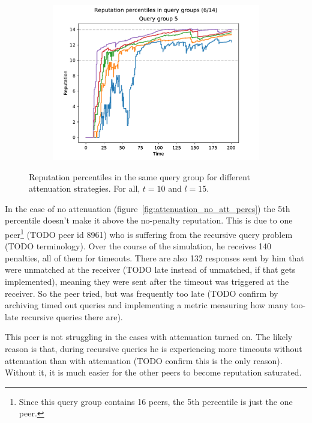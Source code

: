 \begin{figure}[t]
\begin{subfigure}[t]{0.45\columnwidth}
    \includegraphics[width=\columnwidth]{figures/attenuation_1_8_harmonic_rep_percs_6_of_14}
    \label{fig:attenuation_harmonic_percs}
  \end{subfigure}
  \caption{Reputation percentiles in the same query group for different
  attenuation strategies. For all, $t = 10$ and $l = 15$.}
  \label{fig:attenuation_percs}
\end{figure}

In the case of no attenuation (figure~\ref{fig:attenuation_no_att_percs}) the
5th percentile doesn't make it above the no-penalty reputation. This is due to
one peer\footnote{Since this query group contains 16 peers, the 5th percentile
is just the one peer.} (TODO peer id 8961) who is suffering from the recursive
query problem (TODO terminology). Over the course of the simulation, he receives
140 penalties, all of them for timeouts. There are also 132 responses sent by
him that were unmatched at the receiver (TODO late instead of unmatched, if that
gets implemented), meaning they were sent after the timeout was triggered at the
receiver. So the peer tried, but was frequently too late (TODO confirm by
archiving timed out queries and implementing a metric measuring how many
too-late recursive queries there are).

This peer is not struggling in the cases with attenuation turned on. The likely
reason is that, during recursive queries he is experiencing more timeouts
without attenuation than with attenuation (TODO confirm this is the only
reason). Without it, it is much easier for the other peers to become reputation
saturated.


